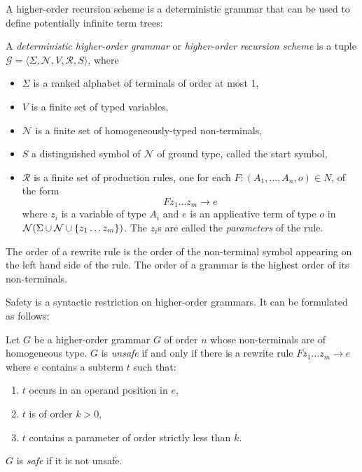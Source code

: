 A higher-order recursion scheme is a deterministic grammar that can be used to define potentially infinite term trees:
\begin{dfn}
A \emph{deterministic higher-order grammar} or \emph{higher-order recursion scheme} is a tuple $\mathcal{G} =
\langle \Sigma, \mathcal{N}, V, \mathcal{R}, S \rangle$, where
\begin{itemize}
\item $\Sigma$ is a ranked alphabet of terminals of order at most 1,
\item $V$ is a finite set of typed variables,
\item $\mathcal{N}$ is a finite set of homogeneously-typed non-terminals,
\item $S$ a distinguished symbol of $\mathcal{N}$ of ground type, called the start symbol,
\item $\mathcal{R}$ is a finite set of production rules, one for each $F : (A_1, \ldots, A_n, o) \in N$, of the form
    $$ F z_1 \ldots z_m \rightarrow e$$
where $z_i$ is a variable of type $A_i$ and $e$ is an applicative
term of type $o$ in $\mathcal{N}(\Sigma \cup \mathcal{N} \cup
\{z_1 \ldots z_m \} )$. The $z_i$s are called the \emph{parameters}
of the rule.
\end{itemize}
\end{dfn}
The order of a rewrite rule is the order of the non-terminal symbol
appearing on the left hand side of the rule. The order of a grammar
is the highest order of its non-terminals.

Safety is a syntactic restriction on higher-order grammars. It can be formulated as
follows:
\begin{dfn}
  Let $G$ be a higher-order grammar $G$ of order $n$
    whose non-terminals are of homogeneous type.
    $G$ is \emph{unsafe} if and only if there is a rewrite rule $F z_1 \ldots z_m \rightarrow e$ where
   $e$ contains a subterm $t$ such that:
  \begin{enumerate}
    \item $t$ occurs in an operand position in $e$,
    \item $t$ is of order $k>0$,
    \item $t$ contains a parameter of order strictly less than $k$.
  \end{enumerate}
  $G$ is \emph{safe} if it is not unsafe.
\end{dfn}

